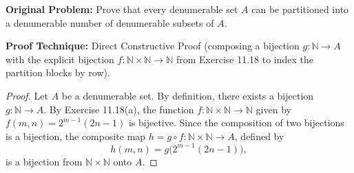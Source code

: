 \documentclass[11pt, letterpaper]{article}
\theoremstyle{definition}
\theoremstyle{remark}
\begin{document}
\textbf{Original Problem:} Prove that every denumerable set $A$ can be partitioned into a denumerable number of denumerable subsets of $A$.

\textbf{Proof Technique:} Direct Constructive Proof (composing a bijection $g : \mathbb{N} \to A$ with the explicit bijection $f : \mathbb{N} \times \mathbb{N} \to \mathbb{N}$ from Exercise 11.18 to index the partition blocks by row).

\begin{proof}
Let $A$ be a denumerable set. By definition, there exists a bijection $g : \mathbb{N} \to A$. By Exercise 11.18(a), the function $f : \mathbb{N} \times \mathbb{N} \to \mathbb{N}$ given by $f(m, n) = 2^{m-1}(2n - 1)$ is bijective. Since the composition of two bijections is a bijection, the composite map $h = g \circ f : \mathbb{N} \times \mathbb{N} \to A$, defined by
\[
h(m, n) = g\bigl(2^{m-1}(2n - 1)\bigr),
\]
is a bijection from $\mathbb{N} \times \mathbb{N}$ onto $A$.


\end{proof}
\end{document}
